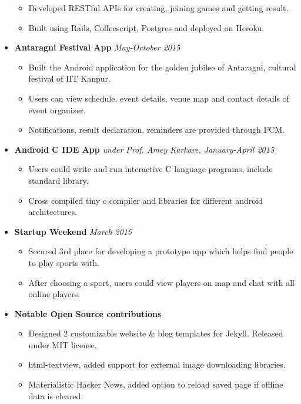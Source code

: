 \documentclass[a4paper]{article}
\begin{document}
\begin{itemize}
\begin{itemize}
		\item Developed RESTful APIs for creating, joining games and getting result.
		\item Built using Rails, Coffeescript, Postgres and deployed on Heroku.
	      \end{itemize}
	\item
	      \textbf{Antaragni Festival App}
	      \hfill \textit{May-October 2015}
	      \begin{itemize}
	      	\vspace{-2mm} \setlength\itemsep{-0.7mm}
	      	\item Built the Android application for the golden jubilee of Antaragni, cultural festival of IIT Kanpur.
	      	\item Users can view schedule, event details, venue map and contact details of event organizer.
	      	\item Notifications, result declaration, reminders are provided through FCM.
	      \end{itemize}
	\item
	      \textbf{Android C IDE App}
	      \hfill \textit{under Prof. Amey Karkare, January-April 2015}
	      \begin{itemize}
	      	\vspace{-2mm} \setlength\itemsep{-0.7mm}
	      	\item Users could write and run interactive C language programs, include standard library.
	      	\item Cross compiled tiny c compiler and libraries for different android architectures.
	      \end{itemize}
		\item
	      \textbf{Startup Weekend}
	      \hfill \textit{March 2015}
	      \begin{itemize}
	      	\vspace{-2mm} \setlength\itemsep{-0.7mm}
	      	\item Secured 3rd place for developing a prototype app which helps find people to play sports with.
	      	\item After choosing a sport, users could view players on map and chat with all online players.
	      \end{itemize}
	\item
	      \textbf{Notable Open Source contributions}
	      \begin{itemize}
	      	\vspace{-2mm} \setlength\itemsep{-0.7mm}
	      	\item Designed 2 customizable website \& blog templates for Jekyll. Released under MIT license.
	      	\item html-textview, added support for external image downloading libraries.
	      	\item Materialistic Hacker News, added option to reload saved page if offline data is cleared.
	      \end{itemize}
\end{itemize}
\end{document}

